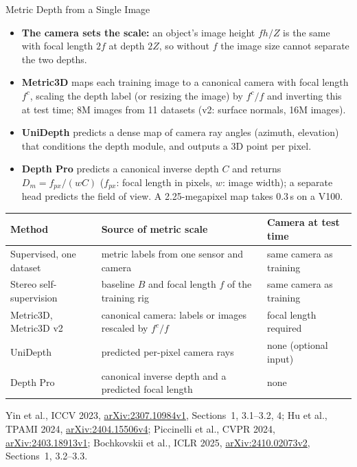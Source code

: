 \begin{frame}{Metric Depth from a Single Image}
  \begin{itemize}\footnotesize\itemsep0.2em
    \item \textbf{The camera sets the scale:} an object's image height $fh/Z$ is the same with focal length $2f$ at depth $2Z$, so without $f$ the image size cannot separate the two depths.
    \item \textbf{Metric3D} maps each training image to a canonical camera with focal length $f^c$, scaling the depth label (or resizing the image) by $f^c/f$ and inverting this at test time; 8M images from 11 datasets (v2: surface normals, 16M images).
    \item \textbf{UniDepth} predicts a dense map of camera ray angles (azimuth, elevation) that conditions the depth module, and outputs a 3D point per pixel.
    \item \textbf{Depth Pro} predicts a canonical inverse depth $C$ and returns $D_m = f_{px}/(wC)$ ($f_{px}$: focal length in pixels, $w$: image width); a separate head predicts the field of view. A 2.25-megapixel map takes 0.3\,s on a V100.
  \end{itemize}
  \vspace{0.1em}
  {\centering\scriptsize
  \begin{tabular}{>{\raggedright\arraybackslash}p{2.8cm} >{\raggedright\arraybackslash}p{6.0cm} >{\raggedright\arraybackslash}p{3.2cm}}
    \toprule
    \textbf{Method} & \textbf{Source of metric scale} & \textbf{Camera at test time} \\
    \midrule
    Supervised, one dataset & metric labels from one sensor and camera & same camera as training \\
    \addlinespace[0.1em]
    Stereo self-supervision & baseline $B$ and focal length $f$ of the training rig & same camera as training \\
    \addlinespace[0.1em]
    Metric3D, Metric3D v2 & canonical camera: labels or images rescaled by $f^c/f$ & focal length required \\
    \addlinespace[0.1em]
    UniDepth & predicted per-pixel camera rays & none (optional input) \\
    \addlinespace[0.1em]
    Depth Pro & canonical inverse depth and a predicted focal length & none \\
    \bottomrule
  \end{tabular}\par}
  \vspace{0.2em}
  {\scriptsize Yin et al., ICCV 2023, \href{https://arxiv.org/abs/2307.10984v1}{arXiv:2307.10984v1}, Sections~1, 3.1--3.2, 4; Hu et al., TPAMI 2024, \href{https://arxiv.org/abs/2404.15506v4}{arXiv:2404.15506v4}; Piccinelli et al., CVPR 2024, \href{https://arxiv.org/abs/2403.18913v1}{arXiv:2403.18913v1}; Bochkovskii et al., ICLR 2025, \href{https://arxiv.org/abs/2410.02073v2}{arXiv:2410.02073v2}, Sections~1, 3.2--3.3.\par}
\end{frame}

